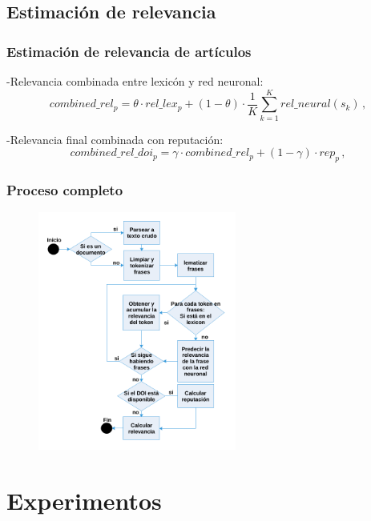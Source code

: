 \documentclass[10pt,fleqn]{beamer}
\begin{document}
\subsection{Estimación de relevancia}
\begin{frame} \frametitle{Estimación de relevancia de artículos} 

-Relevancia combinada entre lexicón y red neuronal:
\begin{equation}
	combined\_rel_{p} = \theta \cdot rel\_lex_{p} + (1-\theta) \cdot \frac{1}{K} \sum \limits_{k=1}^K rel\_neural(s_k)\,,
    \label{eq:7}
\end{equation}

-Relevancia final combinada con reputación:
\begin{equation}
	combined\_rel\_doi_{p} = \gamma \cdot combined\_rel_{p} + (1-\gamma)\cdot rep_{p} \,,
    \label{eq:8}
\end{equation}

\end{frame}

\begin{frame} \frametitle{Proceso completo} 

\begin{figure}  \centering
  \includegraphics[width=6.5cm, keepaspectratio]{images/pipeline_esp.png}
\end{figure}

\end{frame}


\section{Experimentos}
\end{document}
